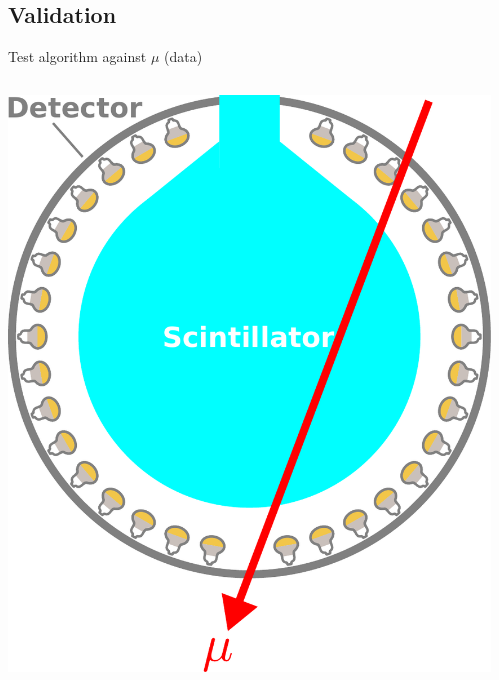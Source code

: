 \documentclass[14pt]{beamer}
\begin{document}
\subsection{Validation}
\begin{frame}{Test algorithm against $\mu$ (data)}
	\begin{columns}[t]
		\begin{block}{}
			\vspace{5mm}
			\includegraphics[width=\linewidth]{through_going_muon-with_scintillator.pdf}
		\end{block}
		\begin{block}{\centering{{\fontsize{10pt}{10pt}\selectfont{Agreement
			with $\mu$-fitter\\which uses\\entry/exit points\\~}}}}

\end{block}
\end{columns}
\end{frame}
\end{document}
